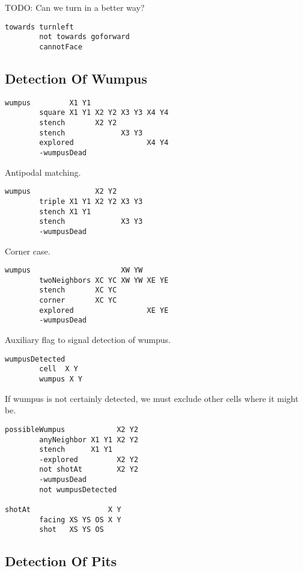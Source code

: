 TODO: Can we turn in a better way?

\begin{verbatim}
towards turnleft
        not towards goforward
        cannotFace
\end{verbatim}

\hypertarget{detection-of-wumpus}{%
\subsection{Detection Of Wumpus}\label{detection-of-wumpus}}

\begin{verbatim}
wumpus         X1 Y1
        square X1 Y1 X2 Y2 X3 Y3 X4 Y4
        stench       X2 Y2
        stench             X3 Y3
        explored                 X4 Y4
        -wumpusDead
\end{verbatim}

Antipodal matching.

\begin{verbatim}
wumpus               X2 Y2
        triple X1 Y1 X2 Y2 X3 Y3
        stench X1 Y1
        stench             X3 Y3
        -wumpusDead
\end{verbatim}

Corner case.

\begin{verbatim}
wumpus                     XW YW
        twoNeighbors XC YC XW YW XE YE
        stench       XC YC
        corner       XC YC
        explored                 XE YE
        -wumpusDead
\end{verbatim}

Auxiliary flag to signal detection of wumpus.

\begin{verbatim}
wumpusDetected
        cell  X Y
        wumpus X Y
\end{verbatim}

If wumpus is not certainly detected, we must exclude other cells where
it might be.

\begin{verbatim}
possibleWumpus            X2 Y2
        anyNeighbor X1 Y1 X2 Y2
        stench      X1 Y1
        -explored         X2 Y2
        not shotAt        X2 Y2
        -wumpusDead
        not wumpusDetected

shotAt                  X Y
        facing XS YS OS X Y
        shot   XS YS OS
\end{verbatim}

\hypertarget{detection-of-pits}{%
\subsection{Detection Of Pits}\label{detection-of-pits}}

